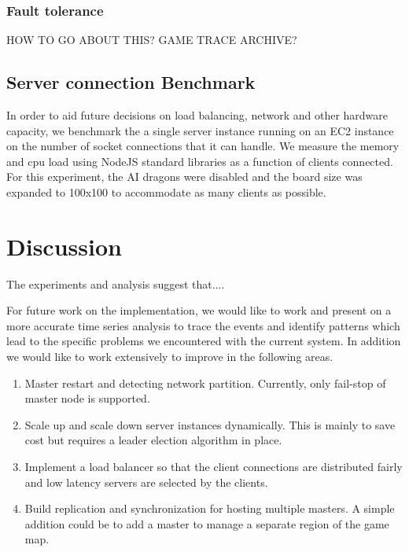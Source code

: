 \documentclass[a4paper]{IEEEtran}
\begin{document}
  \subsubsection{Fault tolerance}

  HOW TO GO ABOUT THIS? GAME TRACE ARCHIVE?

  \subsection{Server connection Benchmark}

  In order to aid future decisions on load balancing, network and other hardware capacity, we benchmark the a single server instance running on an EC2 instance on the number of socket connections that it can handle. We measure the memory and cpu load using NodeJS standard libraries as a function of clients connected. For this experiment, the AI dragons were disabled and the board size was expanded to 100x100 to accommodate as many clients as possible.
  
  \section{Discussion}
  
  \label{sec:discussion}
  
  The experiments and analysis suggest that....
  
  For future work on the implementation, we would like to work and present on a more accurate time
  series analysis to trace the events and identify patterns which lead to the specific problems
  we encountered with the current system. In addition we would like to work extensively to improve in the following areas.
  
  \begin{enumerate}
    \item Master restart and detecting network partition. Currently, only fail-stop of master node is supported.
    \item Scale up and scale down server instances dynamically. This is mainly to save cost but requires a leader election algorithm in place.
    \item Implement a load balancer so that the client connections are distributed fairly and low latency servers are selected by the clients. 
    \item Build replication and synchronization for hosting multiple masters. A simple addition could be to add a master to manage a separate region of the game map.
  \end{enumerate}
  
\end{document}
